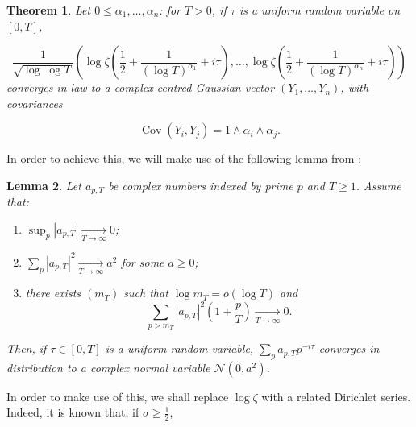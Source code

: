 \documentclass{article}
\DeclareMathOperator{\Cov}{Cov}
\newcommand{\1}{\mathds{1}}
\numberwithin{equation}{section}
\renewcommand{\leq}{\leqslant}
\renewcommand{\geq}{\geqslant}
\theoremstyle{plain} %
\newtheorem{theorem}{Theorem}[section]
\newtheorem{lemma}[theorem]{Lemma}
\newcommand{\hf}{\frac{1}{2}}
\begin{document}
\begin{theorem}
\label{fidi}
    Let $0 \leq \alpha_1, \ldots, \alpha_n$: for $T > 0$, if $\tau$ is a uniform random variable on $[0, T]$,

    \begin{equation}
    \frac{1}{\sqrt{\log \log T}}\left(\log \zeta(\hf + \dfrac{1}{(\log T)^{\alpha_1}} + i \tau  ), \ldots, \log \zeta(\hf + \dfrac{1}{(\log T)^{\alpha_n}} + i \tau) \right)
\end{equation}
converges in law to a complex centred Gaussian vector $(Y_1, \ldots, Y_n)$, with covariances

    \begin{equation}
        \Cov(Y_i, Y_j) = 1 \land \alpha_i \land \alpha_j.
    \end{equation}
\end{theorem}

In order to achieve this, we will make use of the following lemma from \cite{bourgade}:

\begin{lemma}
\label{fidilemma}
    Let $a_{p, T}$ be complex numbers indexed by prime $p$ and $T \geq 1$. Assume that:
\begin{enumerate}

    \item $\sup_{p} |a_{p, T}| \underset{T \to \infty}{\longrightarrow} 0$;
    \item $\sum_p |a_{p, T}|^2 \underset{T \to \infty}{\longrightarrow} a^2$ for some $a \geq 0$;
    \item there exists $(m_T)$ such that $\log m_T = o(\log T)$ and
    \begin{equation}
        \sum_{p > m_T} |a_{p, T}|^2 (1+\dfrac{p}{T})\underset{T \to \infty}{\longrightarrow} 0.
    \end{equation}
\end{enumerate}
Then, if $\tau \in [0, T]$ is a uniform random variable,
    $\sum_{p} a_{p, T} p^{-i \tau}$ converges in distribution to a complex normal variable $\mathscr{N}(0, a^2)$.
\end{lemma}

In order to make use of this, we shall replace $\log \zeta$ with a related Dirichlet series. Indeed, it is known that, if $\sigma \geq \hf$,
\end{document}
